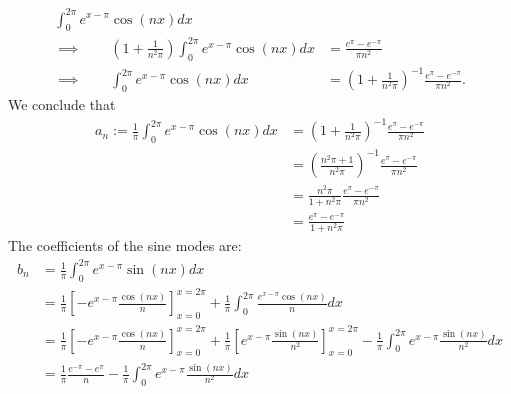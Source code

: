 \documentclass[11pt]{article}
\begin{document}
\begin{solution}
\begin{itemize}
\begin{align*}
            \int_{0}^{2\pi} e^{x-\pi} \cos(n x) dx
            \\
            \implies\qquad 
            \left( 1 + \frac 1 {n^2\pi} \right)
            \int_{0}^{2\pi} e^{x-\pi} \cos(n x) dx
            &=
            \frac{e^{\pi} - e^{-\pi}}{\pi n^2}
            \\
            \implies\qquad 
            \int_{0}^{2\pi} e^{x-\pi} \cos(n x) dx
            &=
            \left( 1 + \frac 1 {n^2\pi} \right)^{-1}
            \frac{e^{\pi} - e^{-\pi}}{\pi n^2}
            .   
        \end{align*}
        We conclude that 
        \begin{align*}
            a_n := 
            \frac{1}{\pi}
            \int_{0}^{2\pi} e^{x - \pi} \cos( n x) dx 
            &= 
            \left( 1 + \frac 1 {n^2\pi} \right)^{-1}
            \frac{e^{\pi} - e^{-\pi}}{\pi n^2}
            \\&= 
            \left( \frac {n^2\pi + 1} {n^2\pi} \right)^{-1}
            \frac{e^{\pi} - e^{-\pi}}{\pi n^2}
            \\&= 
            \frac{n^2\pi}{1+n^2\pi}
            \frac{e^{\pi} - e^{-\pi}}{\pi n^2}
            \\&= 
            \frac{e^{\pi} - e^{-\pi}}{1+n^2\pi}
        \end{align*}
        The coefficients of the sine modes are:
        \begin{align*}
            b_n 
            &
            = 
            \frac{1}{\pi}
            \int_{0}^{2\pi} e^{x - \pi} \sin(n x) dx
            \\&
            =
            \frac{1}{\pi}
            \left[- e^{x - \pi} \frac{ \cos( n x) }{ n } \right]_{x=0}^{x=2\pi}
            +
            \frac{1}{\pi}
            \int_{0}^{2\pi} \frac{ e^{x - \pi} \cos( n x) }{ n } dx
            \\&
            =
            \frac{1}{\pi}
             \left[- e^{x - \pi} \frac{ \cos( n x) }{ n } \right]_{x=0}^{x=2\pi}
            +
            \frac{1}{\pi}
            \left[ e^{x-\pi} \frac{ \sin(n x) }{ n^2 } \right]_{x=0}^{x=2\pi}
            -
            \frac{1}{\pi}
            \int_{0}^{2\pi} e^{x-\pi}\frac{ \sin(n x) }{n^2 } dx
            \\&
            =
            \frac{1}{\pi}\frac{e^{-\pi} - e^{\pi}}{n}
            -
            \frac{1}{\pi}
            \int_{0}^{2\pi} e^{x-\pi}\frac{ \sin(n x) }{n^2 } dx
        \end{align*}

\end{itemize}
\end{solution}
\end{document}
